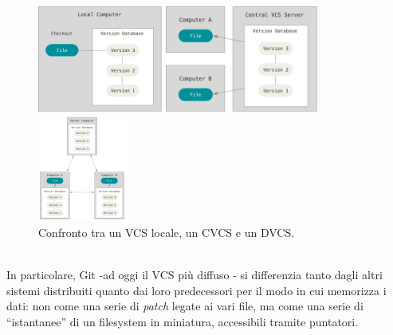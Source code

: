 \documentclass[12pt]{article}
\def\quote#1{``#1''}
\begin{document}
\begin{figure}[h]
	\centering
		\begin{minipage}{4cm}
			\includegraphics[height=3.5cm]{local.png}
		\end{minipage}
		\qquad
		\begin{minipage}{4cm}
			 \includegraphics[height=3.5cm]{centralized.png}
		\end{minipage}
		\qquad
		\qquad
		\begin{minipage}{4cm}
			\includegraphics[height=3.5cm]{distributed.png}
		\end{minipage}
	\caption{Confronto tra un VCS locale, un CVCS e un DVCS.}
\end{figure}
\\In particolare, Git -ad oggi il VCS più diffuso \cite{openhub}- si differenzia tanto dagli altri sistemi distribuiti quanto dai loro predecessori per il modo in cui memorizza i dati: non come una serie di \textit{patch} legate ai vari file, ma come una serie di \quote{istantanee} di un filesystem in miniatura, accessibili tramite puntatori.
\end{document}
